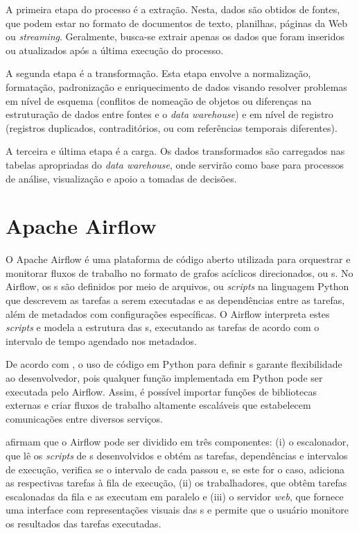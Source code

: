 \documentclass[
	12pt,				%
	oneside,			%
	a4paper,			%
	chapter=TITLE,		%
	section=TITLE,		%
	english,			%
	brazil				%
	]{abntex2}
\begin{document}
A primeira etapa do processo  é a extração. Nesta, dados são obtidos de fontes, que podem estar no formato de documentos de texto, planilhas, páginas da Web ou \textit{streaming}. Geralmente, busca-se extrair apenas os dados que foram inseridos ou atualizados após a última execução do processo.

A segunda etapa é a transformação. Esta etapa envolve a normalização, formatação, padronização e enriquecimento de dados visando resolver problemas em nível de esquema (conflitos de nomeação de objetos ou diferenças na estruturação de dados entre fontes e o \textit{data warehouse}) e em nível de registro (registros duplicados, contraditórios, ou com referências temporais diferentes).

A terceira e última etapa é a carga. Os dados transformados são carregados nas tabelas apropriadas do \textit{data warehouse}, onde servirão como base para processos de análise, visualização e apoio a tomadas de decisões.

\section{Apache Airflow}\label{sec:airflow}

O Apache Airflow é uma plataforma de código aberto utilizada para orquestrar e monitorar fluxos de trabalho no formato de grafos acíclicos direcionados, ou s. No Airflow, os s são definidos por meio de arquivos, ou \textit{scripts} na linguagem Python que descrevem as tarefas a serem executadas e as dependências entre as tarefas, além de metadados com configurações específicas. O Airflow interpreta estes \textit{scripts} e modela a estrutura das s, executando as tarefas de acordo com o intervalo de tempo agendado nos metadados.

De acordo com \cite{de2021data}, o uso de código em Python para definir s garante flexibilidade ao desenvolvedor, pois qualquer função implementada em Python pode ser executada pelo Airflow. Assim, é possível importar funções de bibliotecas externas e criar fluxos de trabalho altamente escaláveis que estabelecem comunicações entre diversos serviços.

\cite{de2021data} afirmam que o Airflow pode ser dividido em três componentes: (i) o escalonador, que lê os \textit{scripts} de s desenvolvidos e obtém as tarefas, dependências e intervalos de execução, verifica se o intervalo de cada  passou e, se este for o caso, adiciona as respectivas tarefas à fila de execução, (ii) os trabalhadores, que obtêm tarefas escalonadas da fila e as executam em paralelo e (iii) o servidor \textit{web}, que fornece uma interface com representações visuais das s e permite que o usuário monitore os resultados das tarefas executadas.
\end{document}
